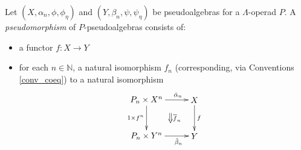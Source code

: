 \begin{Defi}\label{def:ps-morph}
Let $(X, \alpha_n,\phi,\phi_\eta)$ and $(Y, \beta_n,\psi,\psi_{\eta})$ be pseudoalgebras for a $\Lambda$-operad $P$. A \textit{pseudomorphism} of $P$-pseudoalgebras consists of: 
    \begin{itemize}
        \item a functor $f \colon X \rightarrow Y$
        \item for each $n \in \mathbb{N}$, a natural isomorphism $f_n$ (corresponding, via Conventions \ref{conv_coeq}) to a natural isomorphism
            \[
                \xy
                    (0,0)*+{P_n \times X^n}="00";
                    (20,0)*+{X}="10";
                    (0,-15)*+{P_n \times Y^n}="01";
                    (20,-15)*+{Y}="11";
                    {\ar^>>>>>{\tilde{\alpha}_n} "00" ; "10"};
                    {\ar^{f} "10" ; "11"};
                    {\ar_{1 \times f^n} "00" ; "01"};
                    {\ar_>>>>>{\tilde{\beta}_n} "01" ; "11"};
                    {\ar@{=>}^{\overline{f}_n} (10,-5.5) ; (10,-9.5)};
                \endxy
            \]


\end{itemize}
\end{Defi}
